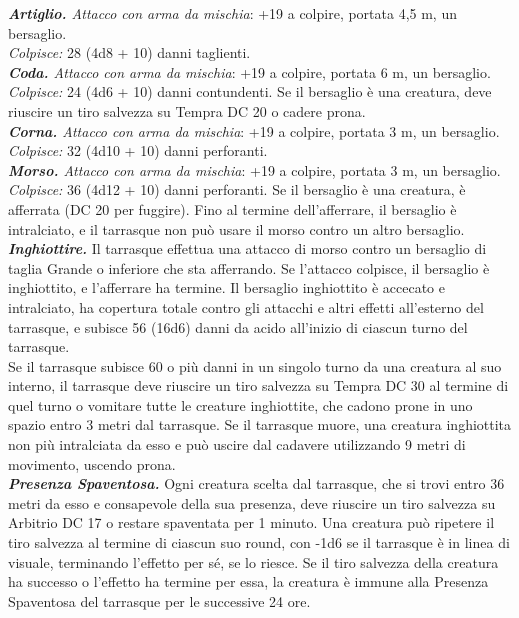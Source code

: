 \begin{multicols}{2}
\emph{\textbf{Artiglio.} Attacco con arma da mischia}: +19 a colpire, portata 4,5 m, un bersaglio.\\
\emph{Colpisce:} 28 (4d8 + 10) danni taglienti. \\
\emph{\textbf{Coda.} Attacco con arma da mischia}: +19 a colpire, portata 6 m, un bersaglio.\\
\emph{Colpisce:} 24 (4d6 + 10) danni contundenti. Se il bersaglio è una creatura, deve riuscire un tiro salvezza su Tempra DC 20 o cadere prona.\\
\emph{\textbf{Corna.} Attacco con arma da mischia}: +19 a colpire, portata 3 m, un bersaglio.\\
\emph{Colpisce:} 32 (4d10 + 10) danni perforanti.\\
\emph{\textbf{Morso.} Attacco con arma da mischia}: +19 a colpire, portata 3 m, un bersaglio.\\
\emph{Colpisce:} 36 (4d12 + 10) danni perforanti. Se il bersaglio è una creatura, è afferrata (DC 20 per fuggire). Fino al termine dell'afferrare, il bersaglio è intralciato, e il tarrasque non può usare il morso contro un altro bersaglio.\\
\emph{\textbf{Inghiottire.}} Il tarrasque effettua una attacco di morso contro un bersaglio di taglia Grande o inferiore che sta afferrando. Se l'attacco colpisce, il bersaglio è inghiottito, e l'afferrare ha termine. Il bersaglio inghiottito è accecato e intralciato, ha copertura totale contro gli attacchi e altri effetti all'esterno del tarrasque, e subisce 56 (16d6) danni da acido all'inizio di ciascun turno del tarrasque.\\
Se il tarrasque subisce 60 o più danni in un singolo turno da una creatura al suo interno, il tarrasque deve riuscire un tiro salvezza su Tempra DC 30 al termine di quel turno o vomitare tutte le creature inghiottite, che cadono prone in uno spazio entro 3 metri dal tarrasque. Se il tarrasque muore, una creatura inghiottita non più intralciata da esso e può uscire dal cadavere utilizzando 9 metri di movimento, uscendo prona.\\
\emph{\textbf{Presenza Spaventosa.}} Ogni creatura scelta dal tarrasque, che si trovi entro 36 metri da esso e consapevole della sua presenza, deve riuscire un tiro salvezza su Arbitrio DC 17 o restare spaventata per 1 minuto. Una creatura può ripetere il tiro salvezza al termine di ciascun suo round, con -1d6 se il tarrasque è in linea di visuale, terminando l'effetto per sé, se lo riesce. Se il tiro salvezza della creatura ha successo o l'effetto ha termine per essa, la creatura è immune alla Presenza Spaventosa del tarrasque per le successive 24 ore.\\

\end{multicols}
